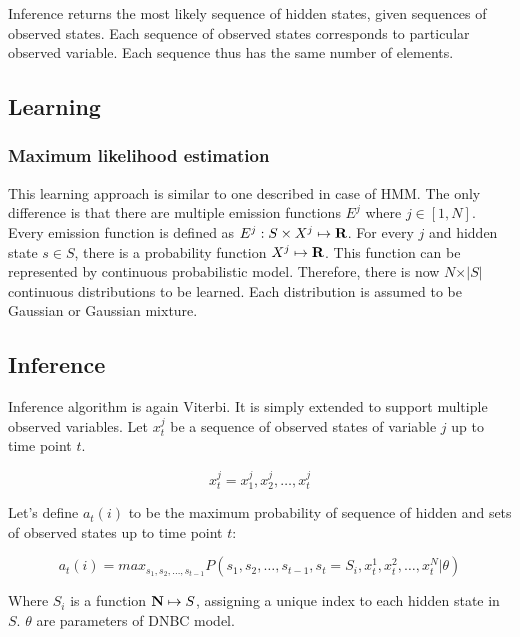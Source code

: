 \documentclass[thesis=B,english]{FITthesis}[2012/06/26]
\begin{document}
Inference returns the most likely sequence of hidden states, given sequences of observed states. Each sequence of observed states corresponds to particular observed variable. Each sequence thus has the same number of elements.

\subsection{Learning}

\subsubsection{Maximum likelihood estimation}

This learning approach is similar to one described in case of HMM. The only difference is that there are multiple emission functions $E^j$ where $j \in [1,N]$. Every emission function is defined as $E^j: S \times X^j \mapsto \textbf R$. For every $j$ and hidden state $s \in S$, there is a probability function $X^j \mapsto \textbf R$. This function can be represented by continuous probabilistic model. Therefore, there is now $N \times \vert{S}\vert$ continuous distributions to be learned. Each distribution is assumed to be Gaussian or Gaussian mixture.

\subsection{Inference}

Inference algorithm is again Viterbi. It is simply extended to support multiple observed variables. Let $x_t^j$ be a sequence of observed states of variable $j$ up to time point $t$.

\begin{equation}
x_t^j = x_1^j,x_2^j,\dots,x_t^j
\end{equation}

Let's define $a_t(i)$ to be the maximum probability of sequence of hidden and sets of observed states up to time point $t$:

\begin{equation} \label{eq:dnbc_viterbi_a}
a_t(i) = max_{s_1,s_2,\dots,s_{t-1}} P(s_1,s_2,\dots,s_{t-1},s_t = S_i,x_t^1,x_t^2,\dots,x_t^N| \theta)
\end{equation}

Where $S_i$ is a function $\textbf N \mapsto S$, assigning a unique index to each hidden state in $S$. $\theta$ are parameters of DNBC model.
\end{document}
